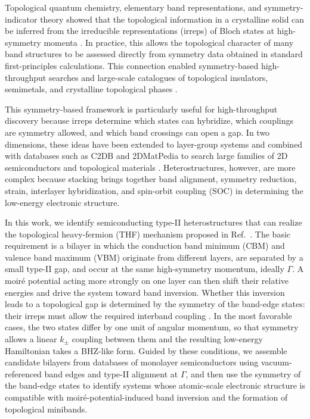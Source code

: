 \documentclass[aps, preprint, prb,]{revtex4-2}
\begin{document}
Topological quantum chemistry, elementary band representations, and symmetry-indicator theory showed that the topological information in a crystalline solid can be inferred from the irreducible representations (irreps) of Bloch states at high-symmetry momenta \cite{Bradlyn2017TQC, Po2017SymmetryIndicators}. In practice, this allows the topological character of many band structures to be assessed directly from symmetry data obtained in standard first-principles calculations. This connection enabled symmetry-based high-throughput searches and large-scale catalogues of topological insulators, semimetals, and crystalline topological phases \cite{Tang2019Efficient, Zhang2019Catalogue, Vergniory2019Catalogue}.

This symmetry-based framework is particularly useful for high-throughput discovery because irreps determine which states can hybridize, which couplings are symmetry allowed, and which band crossings can open a gap. In two dimensions, these ideas have been extended to layer-group systems and combined with databases such as C2DB and 2DMatPedia to search large families of 2D semiconductors and topological materials \cite{Wang2019TwoD,Haastrup2018C2DB,Zhou2019MatPedia, olsen2019discovering, choudhary2020computational}. Heterostructures, however, are more complex because stacking brings together band alignment, symmetry reduction, strain, interlayer hybridization, and spin-orbit coupling (SOC) in determining the low-energy electronic structure.

In this work, we identify semiconducting type-II heterostructures that can realize the topological heavy-fermion (THF) mechanism proposed in Ref.~\cite{Liu2025IdealTHF}. The basic requirement is a bilayer in which the conduction band minimum (CBM) and valence band maximum (VBM) originate from different layers, are separated by a small type-II gap, and occur at the same high-symmetry momentum, ideally $\Gamma$. A moir\'e potential acting more strongly on one layer can then shift their relative energies and drive the system toward band inversion. Whether this inversion leads to a topological gap is determined by the symmetry of the band-edge states: their irreps must allow the required interband coupling \cite{Liu2025IdealTHF, Crepel2025PRX}. In the most favorable cases, the two states differ by one unit of angular momentum, so that symmetry allows a linear $k_\pm$ coupling between them and the resulting low-energy Hamiltonian takes a BHZ-like form. Guided by these conditions, we assemble candidate bilayers from databases of monolayer semiconductors using vacuum-referenced band edges and type-II alignment at $\Gamma$, and then use the symmetry of the band-edge states to identify systems whose atomic-scale electronic structure is compatible with moir\'e-potential-induced band inversion and the formation of topological minibands.
\end{document}
